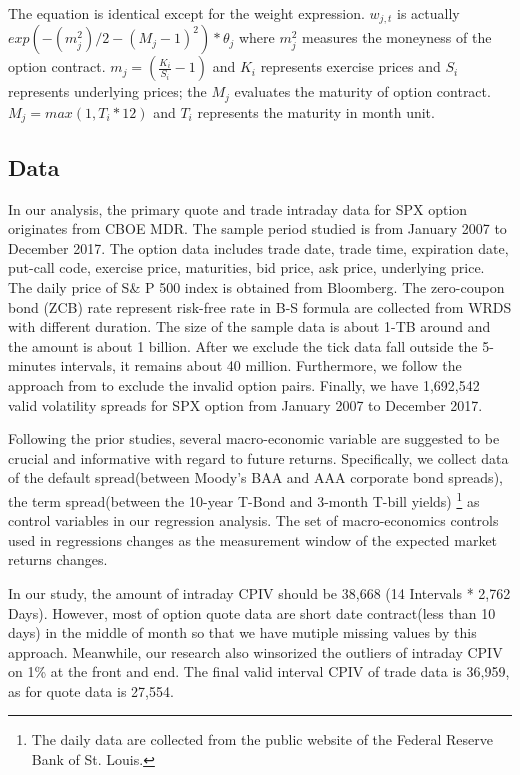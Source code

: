 \begin{enumerate}
The equation is identical except for the weight expression. $w_{j,t}$ is actually $exp(-(m_{j}^{2})/2 -(M_{j} - 1)^{2}) * \theta_{j}$ where $m_{j}^{2}$ measures the moneyness of the option contract.  $m_{j} =  (\frac{K_{i}}{S_{i}} - 1)$ and $K_{i}$ represents exercise prices and $S_{i}$ represents underlying prices; the $M_{j}$ evaluates the maturity of option contract. $M_{j} =  max(1, T_{i}*12) $ and $T_{i}$ represents the maturity in month unit. 


\end{enumerate}


\subsection{Data}
In our analysis, the primary quote and trade intraday data for SPX option originates from CBOE MDR. The sample period studied is from January 2007 to December 2017. The option data includes trade date, trade time, expiration date, put-call code, exercise price, maturities, bid price, ask price, underlying price. The daily price of S\& P 500 index is obtained from Bloomberg. The zero-coupon bond (ZCB) rate represent risk-free rate in B-S formula are collected from WRDS with different duration. The size of the sample data is about 1-TB around and the amount is about 1 billion. After we exclude the tick data fall outside the 5-minutes intervals, it remains about 40 million. Furthermore, we follow the approach from \textcite{ofek2004limited} to exclude the invalid option pairs. Finally, we have 1,692,542 valid volatility spreads for SPX option from January 2007 to December 2017. 


Following the prior studies\textcite{bollerslev2009expected}, several macro-economic variable are suggested to be crucial and informative with regard to future returns. Specifically, we collect data of the default spread(between Moody's BAA and AAA corporate bond spreads), the term spread(between the 10-year T-Bond and 3-month T-bill yields) \footnote{The daily data are collected from the public website of the Federal Reserve Bank of St. Louis.} as control variables in our regression analysis. The set of macro-economics controls used in regressions changes as the measurement window of the expected market returns changes. 


In our study, the amount of intraday CPIV should be 38,668 (14 Intervals * 2,762 Days). However, most of option quote data are short date contract(less than 10 days) in the middle of month so that we have mutiple missing values by this approach. Meanwhile, our research also winsorized the outliers of intraday CPIV on 1\% at the front and end. The final valid interval CPIV of trade data is 36,959, as for quote data is 27,554.


